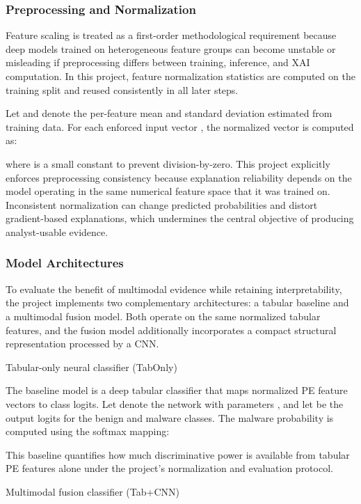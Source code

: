 \documentclass[conference]{IEEEtran}
\begin{document}
\subsubsection{Preprocessing and Normalization}

Feature scaling is treated as a first-order methodological requirement because deep models trained on heterogeneous feature groups can become unstable or misleading if preprocessing differs between training, inference, and XAI computation. In this project, feature normalization statistics are computed on the training split and reused consistently in all later steps.

Let and denote the per-feature mean and standard deviation estimated from training data. For each enforced input vector , the normalized vector is computed as:

where is a small constant to prevent division-by-zero. This project explicitly enforces preprocessing consistency because explanation reliability depends on the model operating in the same numerical feature space that it was trained on. Inconsistent normalization can change predicted probabilities and distort gradient-based explanations, which undermines the central objective of producing analyst-usable evidence.

\subsubsection{Model Architectures}

To evaluate the benefit of multimodal evidence while retaining interpretability, the project implements two complementary architectures: a tabular baseline and a multimodal fusion model. Both operate on the same normalized tabular features, and the fusion model additionally incorporates a compact structural representation processed by a CNN.

Tabular-only neural classifier (TabOnly)

The baseline model is a deep tabular classifier that maps normalized PE feature vectors to class logits. Let denote the network with parameters , and let be the output logits for the benign and malware classes. The malware probability is computed using the softmax mapping:

This baseline quantifies how much discriminative power is available from tabular PE features alone under the project’s normalization and evaluation protocol.

Multimodal fusion classifier (Tab+CNN)
\end{document}
